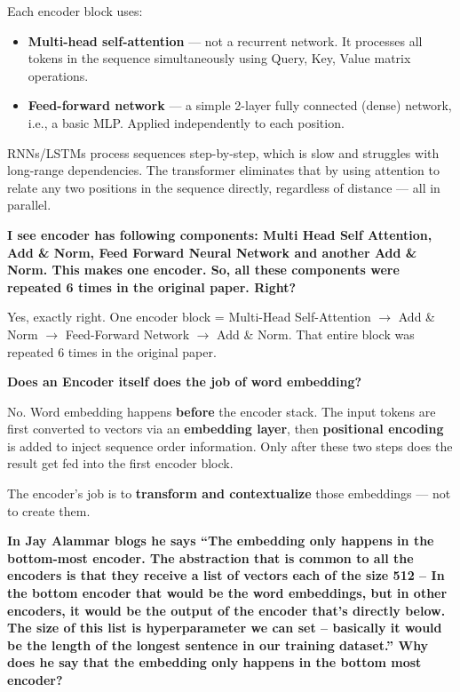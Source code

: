 Each encoder block uses:
\begin{itemize}
  \item \textbf{Multi-head self-attention} --- not a recurrent network. It processes all tokens in the sequence simultaneously using Query, Key, Value matrix operations.
  \item \textbf{Feed-forward network} --- a simple 2-layer fully connected (dense) network, i.e., a basic MLP. Applied independently to each position.
\end{itemize}

RNNs/LSTMs process sequences step-by-step, which is slow and struggles with long-range dependencies. The transformer eliminates that by using attention to relate any two positions in the sequence directly, regardless of distance --- all in parallel.

\medskip

\textbf{I see encoder has following components: Multi Head Self Attention, Add \& Norm, Feed Forward Neural Network and another Add \& Norm. This makes one encoder. So, all these components were repeated 6 times in the original paper. Right?}

Yes, exactly right. One encoder block = Multi-Head Self-Attention $\rightarrow$ Add \& Norm $\rightarrow$ Feed-Forward Network $\rightarrow$ Add \& Norm. That entire block was repeated 6 times in the original paper.

\medskip

\textbf{Does an Encoder itself does the job of word embedding?}

No. Word embedding happens \textbf{before} the encoder stack. The input tokens are first converted to vectors via an \textbf{embedding layer}, then \textbf{positional encoding} is added to inject sequence order information. Only after these two steps does the result get fed into the first encoder block.

The encoder's job is to \textbf{transform and contextualize} those embeddings --- not to create them.

\medskip

\textbf{In Jay Alammar blogs he says ``The embedding only happens in the bottom-most encoder. The abstraction that is common to all the encoders is that they receive a list of vectors each of the size 512 -- In the bottom encoder that would be the word embeddings, but in other encoders, it would be the output of the encoder that's directly below. The size of this list is hyperparameter we can set -- basically it would be the length of the longest sentence in our training dataset.'' Why does he say that the embedding only happens in the bottom most encoder?}

